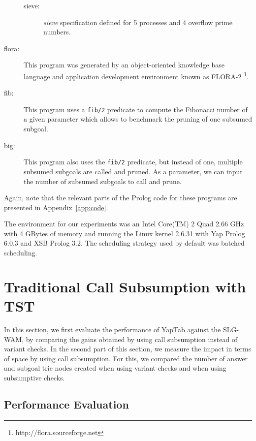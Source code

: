 \begin{description}
\begin{description}
         \item[sieve:] \emph{sieve} specification defined for 5 processes and 4 overflow prime numbers.

      \end{description}
      
   \item[flora:] This program was generated by an object-oriented knowledge base language and application 
               development environment known as FLORA-2 \cite{Yang-00}\footnote{http://flora.sourceforge.net}.
               
   \item[fib:] This program uses a \texttt{fib/2} predicate to compute the Fibonacci number of a given
   parameter which allows to benchmark the pruning of one subsumed subgoal.
   
   \item[big:] This program also uses the \texttt{fib/2} predicate, but instead of one, multiple subsumed subgoals
   are called and pruned. As a parameter, we can input the number of subsumed subgoals to call and prune.
   
\end{description}

Again, note that the relevant parts of the Prolog code for these programs are presented in Appendix~\ref{app:code}.

The environment for our experiments was an Intel Core(TM) 2 Quad 2.66 GHz with 4 GBytes of
memory and running the Linux kernel 2.6.31 with Yap Prolog 6.0.3 and XSB Prolog 3.2.
The scheduling strategy used by default was batched scheduling.

\section{Traditional Call Subsumption with TST}

In this section, we first evaluate the performance of YapTab against the SLG-WAM,
by comparing the gains obtained by using call subsumption instead of variant checks.
In the second part of this section, we measure the impact in terms of space by using
call subsumption. For this, we compared the number of answer and subgoal trie nodes
created when using variant checks and when using subsumptive checks.

\subsection{Performance Evaluation}


